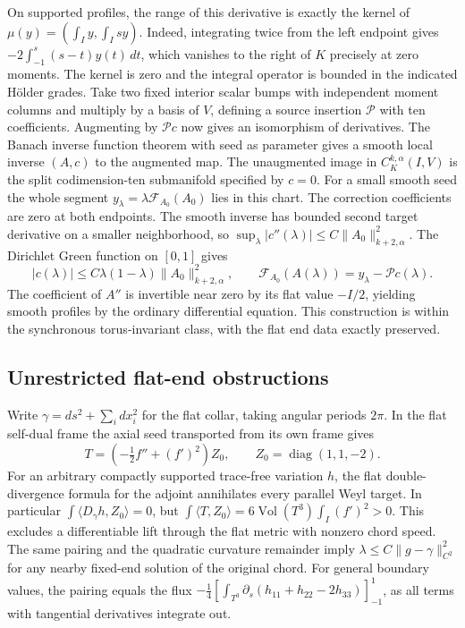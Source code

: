 \documentclass[11pt]{article}
\numberwithin{equation}{section}
\theoremstyle{definition}
\theoremstyle{remark}
\begin{document}
On supported profiles, the range of this derivative is exactly the
kernel of \(\mu(y)=(\int_I y,\int_I s y)\). Indeed, integrating twice
from the left endpoint gives
\(-2\int_{-1}^s(s-t)y(t)\,dt\), which vanishes to the right of \(K\)
precisely at zero moments. The kernel is zero and the integral
operator is bounded in the indicated Hölder grades. Take two fixed
interior scalar bumps with independent moment columns and multiply by
a basis of \(V\), defining a source insertion \(\mathcal P\) with ten
coefficients. Augmenting by \(\mathcal P c\) now gives an isomorphism
of derivatives. The Banach inverse function theorem with seed as
parameter gives a smooth local inverse \((A,c)\) to the augmented map.
The unaugmented image in \(C_K^{k,\alpha}(I,V)\) is the split
codimension-ten submanifold specified by \(c=0\).
For a small smooth seed the whole segment
\(y_\lambda=\lambda\mathcal F_{A_0}(A_0)\) lies in this chart.
The correction coefficients are zero at both endpoints. The smooth
inverse has bounded second target derivative on a smaller neighborhood,
so \(\sup_\lambda|c''(\lambda)|\le C\|A_0\|_{k+2,\alpha}^2\).
The Dirichlet Green function on \([0,1]\) gives
\[
 |c(\lambda)|\le C\lambda(1-\lambda)\|A_0\|_{k+2,\alpha}^2,\qquad
 \mathcal F_{A_0}(A(\lambda))=y_\lambda-\mathcal P c(\lambda).
\]
The coefficient of \(A''\) is invertible near zero by its flat value
\(-I/2\), yielding smooth profiles by the ordinary differential
equation. This construction is within the synchronous torus-invariant
class, with the flat end data exactly preserved.

\subsection{Unrestricted flat-end obstructions}

Write \(\gamma=ds^2+\sum_i dx_i^2\) for the flat collar, taking angular
periods \(2\pi\). In the flat self-dual frame the axial seed transported
from its own frame gives
\[
 T=\left(-\tfrac12 f''+(f')^2\right)Z_0,\qquad
 Z_0=\operatorname{diag}(1,1,-2).
\]
For an arbitrary compactly supported trace-free variation \(h\),
the flat double-divergence formula for the adjoint annihilates every
parallel Weyl target. In particular
\(\int\langle D_\gamma h,Z_0\rangle=0\), but
\(\int\langle T,Z_0\rangle=6\operatorname{Vol}(T^3)\int_I(f')^2>0\).
This excludes a differentiable lift through the flat metric with
nonzero chord speed. The same pairing and the quadratic curvature
remainder imply $\lambda\le C\|g-\gamma\|_{C^2}^2$ for any nearby
fixed-end solution of the original chord. For general boundary values, the pairing
equals the flux
\(-\frac14[\int_{T^3}\partial_s(h_{11}+h_{22}-2h_{33})]_{-1}^1\),
as all terms with tangential derivatives integrate out.
\end{document}
